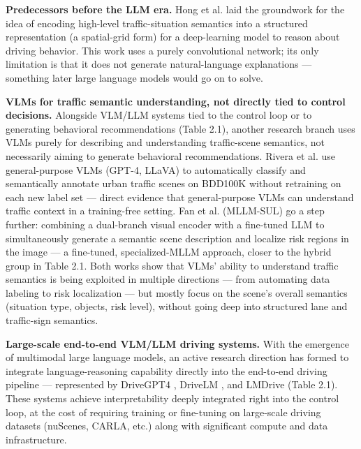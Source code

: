 \documentclass[12pt,a4paper]{report}
\begin{document}
\textbf{Predecessors before the LLM era.} Hong et al. \cite{hong2019rules} laid the groundwork for the idea of encoding high-level traffic-situation semantics into a structured representation (a spatial-grid form) for a deep-learning model to reason about driving behavior. This work uses a purely convolutional network; its only limitation is that it does not generate natural-language explanations --- something later large language models would go on to solve.

\textbf{VLMs for traffic semantic understanding, not directly tied to control decisions.} Alongside VLM/LLM systems tied to the control loop or to generating behavioral recommendations (Table 2.1), another research branch uses VLMs purely for describing and understanding traffic-scene semantics, not necessarily aiming to generate behavioral recommendations. Rivera et al. \cite{rivera2025scenario} use general-purpose VLMs (GPT-4, LLaVA) to automatically classify and semantically annotate urban traffic scenes on BDD100K without retraining on each new label set --- direct evidence that general-purpose VLMs can understand traffic context in a training-free setting. Fan et al. \cite{fan2024mllmsul} (MLLM-SUL) go a step further: combining a dual-branch visual encoder with a fine-tuned LLM to simultaneously generate a semantic scene description and localize risk regions in the image --- a fine-tuned, specialized-MLLM approach, closer to the hybrid group in Table 2.1. Both works show that VLMs' ability to understand traffic semantics is being exploited in multiple directions --- from automating data labeling to risk localization --- but mostly focus on the scene's overall semantics (situation type, objects, risk level), without going deep into structured lane and traffic-sign semantics.

\textbf{Large-scale end-to-end VLM/LLM driving systems.} With the emergence of multimodal large language models, an active research direction has formed to integrate language-reasoning capability directly into the end-to-end driving pipeline --- represented by DriveGPT4 \cite{xu2024drivegpt4}, DriveLM \cite{sima2024drivelm}, and LMDrive \cite{shao2024lmdrive} (Table 2.1). These systems achieve interpretability deeply integrated right into the control loop, at the cost of requiring training or fine-tuning on large-scale driving datasets (nuScenes, CARLA, etc.) along with significant compute and data infrastructure.
\end{document}
